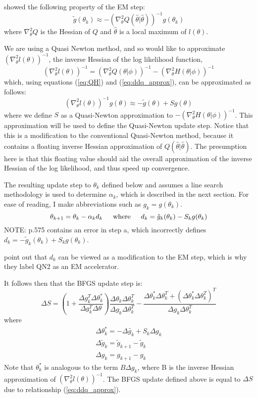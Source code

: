\documentclass[letter,12pt]{article}
\begin{document}
\cite{jamshidianj93} showed the following property of the EM step:
\begin{equation} \label{eq:ddq_approx}
\tilde{g}(\theta_k) \approx -(\nabla^2_{\theta}Q(\hat{\theta}|\hat{\theta}))^{-1}g(\theta_k)
\end{equation}
where $\nabla^2_{\theta}Q$ is the Hessian of $Q$ and $\hat{\theta}$ is a local maximum of $l(\theta)$.  

We are using a Quasi Newton method, and so would like to approximate  $(\nabla^2_{\theta}l(\theta))^{-1}$, the inverse Hessian of the log likelihood function, 
\[
(\nabla^2_{\theta}l(\theta))^{-1}
=
(\nabla^2_{\theta}Q(\theta|\phi))^{-1}
-
(\nabla^2_{\theta}H(\theta|\phi))^{-1}
\]
which, using equations (\ref{eq:QH}) and (\ref{eq:ddq_approx}), can be approximated as follows:
\[
(\nabla^2_{\theta}l(\theta))^{-1}g(\theta)
\approx
-\tilde{g}(\theta)
+
Sg(\theta)
\]
where we define $S$ as a Quasi-Newton approximation to $-(\nabla^2_{\theta}H(\theta|\phi))^{-1}$.  This approximation will be used to define the Quasi-Newton update step.  Notice that this is a modification to the conventional Quasi-Newton method, because it contains a floating inverse Hessian approximation of $Q(\hat{\theta}|\hat{\theta})$.  The presumption here is that this floating value should aid the overall approximation of the inverse Hessian of the log likelihood, and thus speed up convergence.

The resulting update step to $\theta_k$ defined below and assumes a line search methodology is used to determine $\alpha_k$, which is described in the next section.  For ease of reading, I make abbreviations such as $g_k = g(\theta_k)$.
\[
\theta_{k+1} = \theta_k - \alpha_k d_k
\indent
\text{where}
\indent
d_k = \tilde{g}_k(\theta_k) - S_kg(\theta_k)
\]
NOTE: \cite{jamshidianj97} p.575 contains an error in step a, which incorrectly defines $d_k=-\tilde{g}_k(\theta_k) + S_kg(\theta_k)$.

\cite{jamshidianj97} point out that $d_k$ can be viewed as a modification to the EM step, which is why they label QN2 as an EM accelerator.

It follows then that the BFGS update step is:
\[
\Delta S = 
\left(
1 + \frac{\Delta g_k^T \Delta \theta_k^*}{\Delta g_k^T \Delta \theta}
\right)
\frac{\Delta \theta_k \Delta \theta_k^T}{\Delta g_k \Delta \theta_k^T}
-
\frac{\Delta \theta_k^* \Delta \theta_k^T + (\Delta \theta_k^* \Delta \theta_k^T)^T}{\Delta g_k \Delta \theta_k^T}
\]
where
\[
\begin{array}{l}
\Delta \theta_k^* = -\Delta \tilde{g_k} + S_k \Delta g_k \\
\Delta \tilde{g}_k = \tilde{g}_{k+1} - \tilde{g}_{k} \\
\Delta g_k = g_{k+1} - g_k
\end{array}
\]
Note that $\theta_k^*$ is analogous to the term $B\Delta g_k$, where B is the inverse Hessian approximation of $(\nabla^2_{\theta}l(\theta))^{-1}$.  The BFGS update defined above is equal to $\Delta S$ due to relationship (\ref{eq:ddq_approx}).
\end{document}
